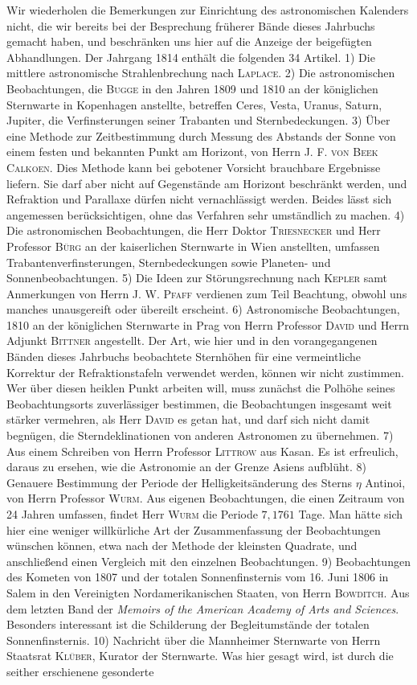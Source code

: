 Wir wiederholen die Bemerkungen zur Einrichtung des astronomischen Kalenders nicht, die wir bereits bei der Besprechung früherer Bände dieses Jahrbuchs gemacht haben, und beschränken uns hier auf die Anzeige der beigefügten Abhandlungen. Der Jahrgang 1814 enthält die folgenden 34 Artikel. 1) Die mittlere astronomische Strahlenbrechung nach \textsc{Laplace}. 2) Die astronomischen Beobachtungen, die \textsc{Bugge} in den Jahren 1809 und 1810 an der königlichen Sternwarte in Kopenhagen anstellte, betreffen Ceres, Vesta, Uranus, Saturn, Jupiter, die Verfinsterungen seiner Trabanten und Sternbedeckungen. 3) Über eine Methode zur Zeitbestimmung durch Messung des Abstands der Sonne von einem festen und bekannten Punkt am Horizont, von Herrn J. F. \textsc{von Beek Calkoen}. Dies Methode kann bei gebotener Vorsicht brauchbare Ergebnisse liefern. Sie darf aber nicht auf Gegenstände am Horizont beschränkt werden, und Refraktion und Parallaxe dürfen nicht vernachlässigt werden. Beides lässt sich angemessen berücksichtigen, ohne das Verfahren sehr umständlich zu machen. 4) Die astronomischen Beobachtungen, die Herr Doktor \textsc{Triesnecker} und Herr Professor \textsc{Bürg} an der kaiserlichen Sternwarte in Wien anstellten, umfassen Trabantenverfinsterungen, Sternbedeckungen sowie Planeten- und Sonnenbeobachtungen. 5) Die Ideen zur Störungsrechnung nach \textsc{Kepler} samt Anmerkungen von Herrn J. W. \textsc{Pfaff} verdienen zum Teil Beachtung, obwohl uns manches unausgereift oder übereilt erscheint. 6) Astronomische Beobachtungen, 1810 an der königlichen Sternwarte in Prag von Herrn Professor \textsc{David} und Herrn Adjunkt \textsc{Bittner} angestellt. Der Art, wie hier und in den vorangegangenen Bänden dieses Jahrbuchs beobachtete Sternhöhen für eine vermeintliche Korrektur der Refraktionstafeln verwendet werden, können wir nicht zustimmen. Wer über diesen heiklen Punkt arbeiten will, muss zunächst die Polhöhe seines Beobachtungsorts zuverlässiger bestimmen, die Beobachtungen insgesamt weit stärker vermehren, als Herr \textsc{David} es getan hat, und darf sich nicht damit begnügen, die Sterndeklinationen von anderen Astronomen zu übernehmen. 7) Aus einem Schreiben von Herrn Professor \textsc{Littrow} aus Kasan. Es ist erfreulich, daraus zu ersehen, wie die Astronomie an der Grenze Asiens aufblüht. 8) Genauere Bestimmung der Periode der Helligkeitsänderung des Sterns $\eta$ Antinoi, von Herrn Professor \textsc{Wurm}. Aus eigenen Beobachtungen, die einen Zeitraum von 24 Jahren umfassen, findet Herr \textsc{Wurm} die Periode $7{,}1761$ Tage. Man hätte sich hier eine weniger willkürliche Art der Zusammenfassung der Beobachtungen wünschen können, etwa nach der Methode der kleinsten Quadrate, und anschließend einen Vergleich mit den einzelnen Beobachtungen. 9) Beobachtungen des Kometen von 1807 und der totalen Sonnenfinsternis vom 16. Juni 1806 in Salem in den Vereinigten Nordamerikanischen Staaten, von Herrn \textsc{Bowditch}. Aus dem letzten Band der \emph{Memoirs of the American Academy of Arts and Sciences}. Besonders interessant ist die Schilderung der Begleitumstände der totalen Sonnenfinsternis. 10) Nachricht über die Mannheimer Sternwarte von Herrn Staatsrat \textsc{Klüber}, Kurator der Sternwarte. Was hier gesagt wird, ist durch die seither erschienene gesonderte 